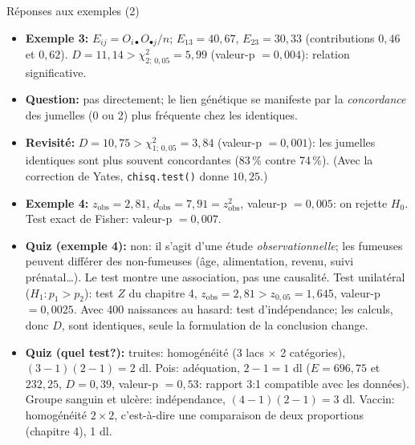 \documentclass{BeamerTemplate}
\begin{document}
\begin{frame}[t]{Réponses aux exemples (2)}

\scriptsize
\begin{itemize}\itemsep1mm
  \item \textbf{Exemple 3:} $E_{ij}=O_{i\bullet}O_{\bullet j}/n$; $E_{13}=40{,}67$,
  $E_{23}=30{,}33$ (contributions $0{,}46$ et $0{,}62$). $D=11{,}14>\chi^2_{2;\,0{,}05}=5{,}99$
  (valeur-p $=0{,}004$): relation significative.
  \item \textbf{Question:} pas directement; le lien génétique se manifeste par la
  \emph{concordance} des jumelles (0 ou 2) plus fréquente chez les identiques.
  \item \textbf{Revisité:} $D=10{,}75>\chi^2_{1;\,0{,}05}=3{,}84$ (valeur-p $=0{,}001$):
  les jumelles identiques sont plus souvent concordantes (83\,\% contre 74\,\%).
  (Avec la correction de Yates, \texttt{chisq.test()} donne $10{,}25$.)
  \item \textbf{Exemple 4:} $z_{\text{obs}}=2{,}81$, $d_{\text{obs}}=7{,}91=z_{\text{obs}}^2$,
  valeur-p $=0{,}005$: on rejette $H_0$. Test exact de Fisher: valeur-p $=0{,}007$.
  \item \textbf{Quiz (exemple 4):} non: il s'agit d'une étude
  \emph{observationnelle}; les fumeuses peuvent différer des non-fumeuses (âge,
  alimentation, revenu, suivi prénatal\ldots). Le test montre une
  \alert{association}, pas une causalité. Test unilatéral ($H_1: p_1>p_2$): test
  $Z$ du chapitre 4, $z_{\text{obs}}=2{,}81>z_{0{,}05}=1{,}645$, valeur-p $=0{,}0025$.
  Avec 400 naissances au hasard: test d'indépendance; les calculs, donc $D$,
  sont identiques, seule la formulation de la conclusion change.
  \item \textbf{Quiz (quel test?):} truites: homogénéité ($3$ lacs $\times$ 2
  catégories), $(3-1)(2-1)=2$ dl. Pois: adéquation, $2-1=1$ dl
  ($E=696{,}75$ et $232{,}25$, $D=0{,}39$, valeur-p $=0{,}53$: rapport 3:1 compatible
  avec les données). Groupe sanguin et ulcère: indépendance, $(4-1)(2-1)=3$ dl.
  Vaccin: homogénéité $2\times2$, c'est-à-dire une comparaison de deux proportions
  (chapitre 4), 1 dl.
\end{itemize}

\end{frame}
\end{document}
